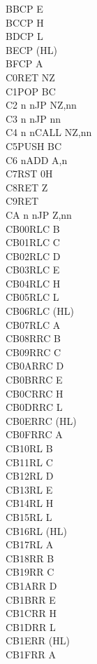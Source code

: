 \documentclass[12pt,twoside,openright,a4paper]{book}
\begin{document}
\begin{multicols}{3}
{\begin{tabbing}
	BB\>CP E\\
	BC\>CP H\\
	BD\>CP L\\
	BE\>CP (HL)\\
	BF\>CP A\\
	C0\>RET NZ\\
	C1\>POP BC\\
	C2 n n\>JP NZ,nn\\
	C3 n n\>JP nn\\
	C4 n n\>CALL NZ,nn\\
	C5\>PUSH BC\\
	C6 n\>ADD A,n\\
	C7\>RST 0H\\
	C8\>RET Z\\
	C9\>RET\\
	CA n n\>JP Z,nn\\
	CB00\>RLC B\\
	CB01\>RLC C\\
	CB02\>RLC D\\
	CB03\>RLC E\\
	CB04\>RLC H\\
	CB05\>RLC L\\
	CB06\>RLC (HL)\\
	CB07\>RLC A\\
	CB08\>RRC B\\
	CB09\>RRC C\\
	CB0A\>RRC D\\
	CB0B\>RRC E\\
	CB0C\>RRC H\\
	CB0D\>RRC L\\
	CB0E\>RRC (HL)\\
	CB0F\>RRC A\\
	CB10\>RL B\\
	CB11\>RL C\\
	CB12\>RL D\\
	CB13\>RL E\\
	CB14\>RL H\\
	CB15\>RL L\\
	CB16\>RL (HL)\\
	CB17\>RL A\\
	CB18\>RR B\\
	CB19\>RR C\\
	CB1A\>RR D\\
	CB1B\>RR E\\
	CB1C\>RR H\\
	CB1D\>RR L\\
	CB1E\>RR (HL)\\
	CB1F\>RR A\\

\end{tabbing}}
\end{multicols}
\end{document}
